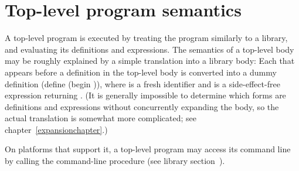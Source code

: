 \section{Top-level program semantics}

A top-level program is executed by treating the program similarly to a library, and
evaluating its definitions and expressions.
The semantics of a top-level body may be roughly explained by
a simple translation into a library body: 
Each  that appears before a
definition in
the top-level body is converted into a dummy definition 
{\cf (define  (begin  ))},
where  is a fresh identifier and 
is a side-effect-free expression returning \unspecifiedreturn.
(It is generally impossible to determine which forms are 
definitions and expressions without concurrently expanding the body, so
the actual translation is somewhat more complicated; see
chapter~\ref{expansionchapter}.)

On platforms that support it, a top-level program may access its command line 
by calling the {\cf command-line} procedure (see library 
section~).

